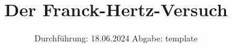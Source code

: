 

\subject{v601}
\title{Der Franck-Hertz-Versuch}
\date{%
  Durchführung: 18.06.2024
  \hspace{3em}
  Abgabe: template
}



\maketitle
\thispagestyle{empty}
\tableofcontents
\newpage






\printbibliography{}

